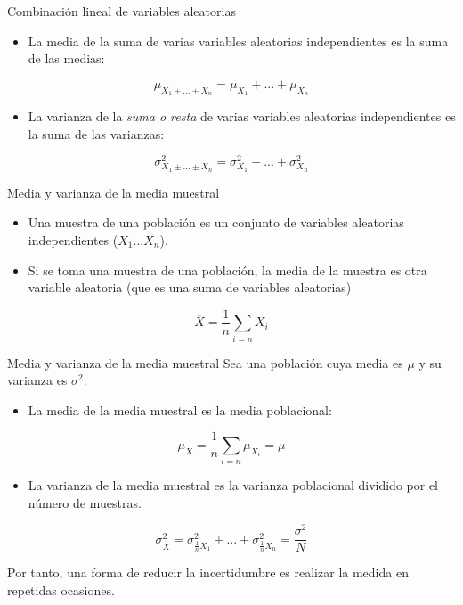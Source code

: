 \documentclass[aspectratio=169, usenames,svgnames,dvipsnames]{beamer}
\begin{document}
\begin{frame}[label={sec:org9203e09}]{Combinación lineal de variables aleatorias}
\begin{itemize}
\item La \alert{media de la suma} de varias variables aleatorias \alert{independientes} es
la suma de las medias:
\end{itemize}
\[
\mu_{X_{1}+...+X_{n}}=\mu_{X_{1}}+...+\mu_{X_{n}}
\]

\begin{itemize}
\item La \alert{varianza de la \emph{suma o resta}} de varias variables aleatorias
\alert{independientes} es la \alert{suma} de las varianzas:
\end{itemize}

\[
\sigma_{X_{1}\pm...\pm X_{n}}^{2}=\sigma_{X_{1}}^{2}+...+\sigma_{X_{n}}^{2}
\]
\end{frame}



\begin{frame}[label={sec:org0695a47}]{Media y varianza de la media muestral}
\begin{itemize}
\item Una \alert{muestra de una población} es un conjunto de variables
aleatorias independientes (\(X_{1}...X_{n}\)).

\item Si se toma una muestra de una población, la media de la muestra es otra
variable aleatoria (que es una suma de variables aleatorias)
\end{itemize}

\[
\overline{X}=\frac{1}{n}\sum_{i=n}X_{i}
\]
\end{frame}



\begin{frame}[label={sec:org01bdd31}]{Media y varianza de la media muestral}
Sea una población cuya media es \(\mu\) y su varianza es \(\sigma^{2}\):

\begin{itemize}
\item La \alert{media de la media muestral} es la media poblacional:
\end{itemize}
\[
\mu_{\overline{X}}=\frac{1}{n}\sum_{i = n}\mu_{X_{i}} = \mu
\]

\begin{itemize}
\item La \alert{varianza de la media muestral} es la varianza poblacional dividido por el número de muestras.
\end{itemize}

\[
\sigma_{\overline{X}}^{2}=\sigma_{\frac{1}{n}X_{1}}^{2}+...+\sigma_{\frac{1}{n}X_{n}}^{2}=\frac{\sigma^2}{N}
\]

\begin{block}{}
Por tanto, una forma de \alert{reducir la incertidumbre} es realizar la
\alert{medida en repetidas ocasiones}.
\end{block}
\end{frame}
\end{document}
